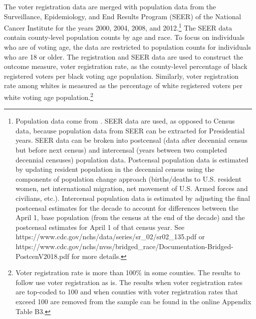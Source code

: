 \documentclass[AEJ, finalmode]{AEA}
\begin{document}
The voter registration data are merged with population data from the Surveillance, Epidemiology, and End Results Program (SEER) of the National Cancer Institute for the years 2000, 2004, 2008, and 2012.\footnote{Population data come from . SEER data are used, as opposed to Census data, because population data from SEER can be extracted for Presidential years. SEER data can be broken into postcensal (data after decennial census but before next census) and intercensal (years between two completed decennial censuses) population data. Postcensal population data is estimated by updating resident population in the decennial census using the components of population change approach (births/deaths to U.S. resident women, net international migration, net movement of U.S. Armed forces and civilians, etc.). Intercensal population data is estimated by adjusting the final postcensal estimates for the decade to account for differences between the April 1, base population (from the census at the end of the decade) and the postcensal estimates for April 1 of that census year. See https://www.cdc.gov/nchs/data/series/sr\_02/sr02\_135.pdf or https://www.cdc.gov/nchs/nvss/bridged\_race/Documentation-Bridged-PostcenV2018.pdf for more details.} The SEER data contain county-level population counts by age and race. To focus on individuals who are of voting age, the data are restricted to population counts for individuals who are 18 or older. The registration and SEER data are used to construct the outcome measure, voter registration rate, as the county-level percentage of black registered voters per black voting age population. Similarly, voter registration rate among whites is measured as the percentage of white registered voters per white voting age population.\footnote{Voter registration rate is more than 100\% in some counties. The results to follow use voter registration as is. The results when voter registration rates are top-coded to 100 and when counties with voter registration rates that exceed 100 are removed from the sample can be found in the online Appendix Table B3.}
\end{document}
